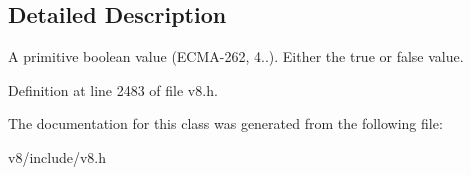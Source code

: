 \subsection{Detailed Description}
A primitive boolean value (E\+C\+M\+A-\/262, 4..). Either the true or false value. 

Definition at line 2483 of file v8.\+h.



The documentation for this class was generated from the following file\+:\begin{DoxyCompactItemize}
\item 
v8/include/v8.\+h\end{DoxyCompactItemize}
